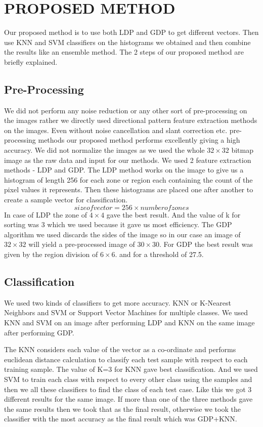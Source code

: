 \documentclass[conference]{IEEEtran}
\begin{document}
\section{PROPOSED METHOD}
Our proposed method is to use both LDP and GDP to get different vectors. Then use KNN and SVM classifiers on the histograms we obtained and then combine the results like an ensemble method. The 2 steps of our proposed method are briefly explained.
\subsection{Pre-Processing}
We did not perform any noise reduction or any other sort of pre-processing on the images rather we directly used directional pattern feature extraction methods on the images. Even without noise cancellation and slant correction etc. pre-processing methods our proposed method performs excellently giving a high accuracy. We did not normalize the images as we used the whole $32\times32$ bitmap image as the raw data and input for our methods.
We used 2 feature extraction methods - LDP and GDP. The LDP method works on the image to give us a histogram of length 256 for each zone or region each containing the count of the pixel values it represents. Then
these histograms are placed one after another to create a sample vector for classification.\[size of vector = 256 \times number of zones\]
 In case of LDP the zone of $4 \times 4$ gave the best result. And the value of k for sorting was 3 which we used because it gave us most efficiency. The GDP algorithm we used discards the sides of the image so in our case an image of $32 \times 32$ will yield a pre-processed image of $30 \times 30$. For GDP the best result was given by the region division of $6 \times 6$. and for a threshold of 27.5.
\subsection{Classification}
We used two kinds of classifiers to get more accuracy. KNN or K-Nearest Neighbors and SVM or Support Vector Machines for multiple classes. We used KNN and SVM on an image after performing LDP and KNN on the same image after performing GDP.

The KNN considers each value of the vector as a co-ordinate and performs euclidean distance calculation to classify each test sample with respect to each training sample. The value of K=3 for KNN gave best classification. And we used SVM to train each class with respect to every other class using the samples and then we all these classifiers to find the class of each test case. Like this we got 3 different results for the same image. If more than one of the three methods gave the same results then we took that as the final result, otherwise we took the classifier with the most accuracy as the final result which was GDP+KNN.
\end{document}

